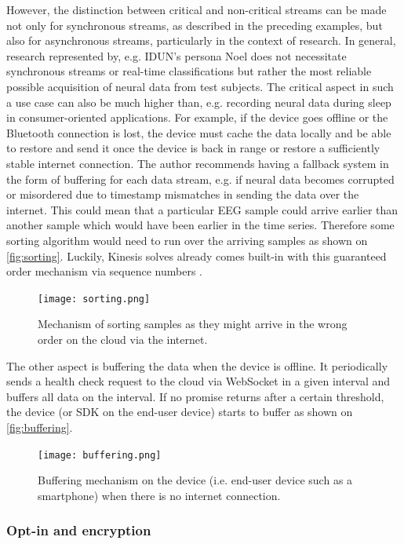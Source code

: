 However, the distinction between critical and non-critical streams can be made not only for synchronous streams, as described in the preceding examples, but also for asynchronous streams, particularly in the context of research. In general, research represented by, e.g. IDUN's persona Noel does not necessitate synchronous streams or real-time classifications but rather the most reliable possible acquisition of neural data from test subjects. The critical aspect in such a use case can also be much higher than, e.g. recording neural data during sleep in consumer-oriented applications. For example, if the device goes offline or the Bluetooth connection is lost, the device must cache the data locally and be able to restore and send it once the device is back in range or restore a sufficiently stable internet connection. The author recommends having a fallback system in the form of buffering for each data stream, e.g. if neural data becomes corrupted or misordered due to timestamp mismatches in sending the data over the internet. This could mean that a particular EEG sample could arrive earlier than another sample which would have been earlier in the time series. Therefore some sorting algorithm would need to run over the arriving samples as shown on \autoref{fig:sorting}. Luckily, Kinesis solves already comes built-in with this guaranteed order mechanism via sequence numbers \citep{amazon_web_services_inc_amazon_nodate}.

\begin{figure}[!ht]
  \centering
  \texttt{[image: sorting.png]}
  \caption{Mechanism of sorting samples as they might arrive in the wrong order on the cloud via the internet.}
  \label{fig:sorting}
\end{figure}

The other aspect is buffering the data when the device is offline. It periodically sends a health check request to the cloud via WebSocket in a given interval and buffers all data on the interval. If no promise returns after a certain threshold, the device (or SDK on the end-user device) starts to buffer as shown on \autoref{fig:buffering}.

\begin{figure}[!ht]
  \centering
  \texttt{[image: buffering.png]}
  \caption{Buffering mechanism on the device (i.e. end-user device such as a smartphone) when there is no internet connection.}
  \label{fig:buffering}
\end{figure}

\subsubsection{Opt-in and encryption}
\label{chapter5-opt-in-and-encryption}

